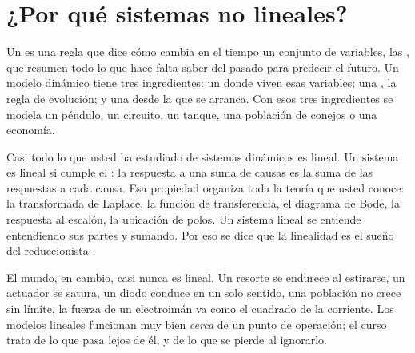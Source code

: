 \section{¿Por qué sistemas no lineales?}
\label{sec:in-porque}

Un  es una regla que dice cómo cambia en el tiempo un conjunto de variables, las , que resumen todo lo que hace falta saber del pasado para predecir el futuro. Un modelo dinámico tiene tres ingredientes: un  donde viven esas variables; una , la regla de evolución; y una  desde la que se arranca. Con esos tres ingredientes se modela un péndulo, un circuito, un tanque, una población de conejos o una economía.

Casi todo lo que usted ha estudiado de sistemas dinámicos es lineal. Un sistema es lineal si cumple el : la respuesta a una suma de causas es la suma de las respuestas a cada causa. Esa propiedad organiza toda la teoría que usted conoce: la transformada de Laplace, la función de transferencia, el diagrama de Bode, la respuesta al escalón, la ubicación de polos. Un sistema lineal se entiende entendiendo sus partes y sumando. Por eso se dice que la linealidad es el sueño del reduccionista \citep{Mit09}.


El mundo, en cambio, casi nunca es lineal. Un resorte se endurece al estirarse, un actuador se satura, un diodo conduce en un solo sentido, una población no crece sin límite, la fuerza de un electroimán va como el cuadrado de la corriente. Los modelos lineales funcionan muy bien \emph{cerca} de un punto de operación; el curso trata de lo que pasa lejos de él, y de lo que se pierde al ignorarlo.

